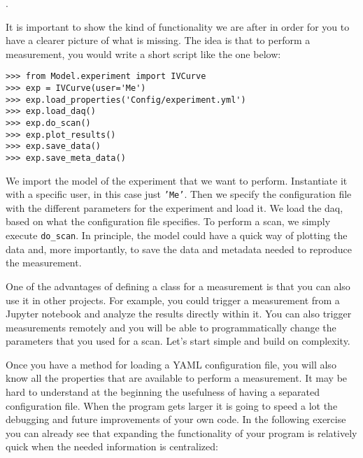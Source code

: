 .

It is important to show the kind of functionality we are after in order for you to have a clearer picture of what is missing. The idea is that to perform a measurement, you would write a short script like the one below:

\begin{verbatim}
>>> from Model.experiment import IVCurve
>>> exp = IVCurve(user='Me')
>>> exp.load_properties('Config/experiment.yml')
>>> exp.load_daq()
>>> exp.do_scan()
>>> exp.plot_results()
>>> exp.save_data()
>>> exp.save_meta_data() 
\end{verbatim}

We import the model of the experiment that we want to perform. Instantiate it with a specific user, in this case just \texttt{'Me'}. Then we specify the configuration file with the different parameters for the experiment and load it. We load the daq, based on what the configuration file specifies. To perform a scan, we simply execute \texttt{do_scan}. In principle, the model could have a quick way of plotting the data and, more importantly, to save the data and metadata needed to reproduce the measurement.

One of the advantages of defining a class for a measurement is that you can also use it in other projects. For example, you could trigger a measurement from a Jupyter notebook and analyze the results directly within it. You can also trigger measurements remotely and you will be able to programmatically change the parameters that you used for a scan. Let's start simple and build on complexity.


Once you have a method for loading a {YAML} configuration file, you will also know all the properties that are available
to perform a measurement. It may be hard to understand at the beginning the usefulness of having a separated configuration file. When the program gets larger it is going to speed a lot the debugging and future improvements of your own code. In the following exercise you can already see that expanding the functionality of your program is relatively quick when the needed information is centralized: 

